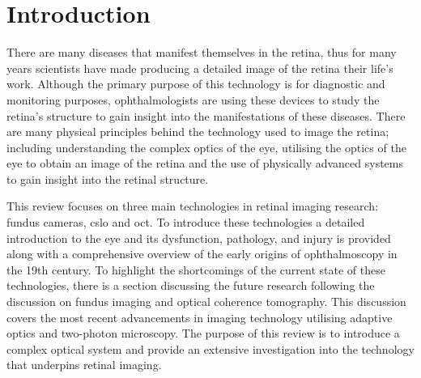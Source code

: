 \chapter{Introduction}

\label{intro}

There are many diseases that manifest themselves  in the  retina, thus
for many years scientists have made producing a detailed image of the
retina their life's work.  Although the primary  purpose of this technology
is for diagnostic and monitoring purposes, ophthalmologists are using
these devices to study the retina's structure to gain insight into the
manifestations of these diseases.  There are many physical principles
behind the technology used to image the retina; including understanding
the complex optics of the eye, utilising the optics of the eye to obtain an
image of the retina and the use of physically advanced systems to gain
insight into the retinal structure.

This review focuses on three main technologies in retinal 
imaging research: fundus cameras, \Gls{cslo} and \Gls{oct}.
To introduce these technologies a detailed introduction 
to the eye and its dysfunction, pathology, and injury is provided 
along with a comprehensive overview of the early origins of 
ophthalmoscopy in the 19th century.  To highlight the shortcomings 
of the current state of these technologies, there is a section discussing 
the future research following the discussion on fundus imaging and 
optical coherence tomography.  This discussion covers the 
most recent advancements in imaging technology utilising adaptive 
optics and two-photon microscopy.  The purpose of this review is to 
introduce a complex optical system and provide an extensive 
investigation into the technology that underpins retinal imaging.
